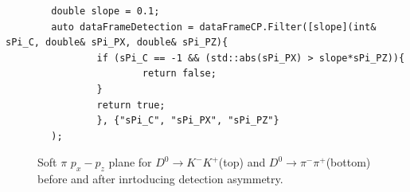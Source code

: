 \documentclass{article}
\begin{document}
    \begin{lstlisting}
        double slope = 0.1;
        auto dataFrameDetection = dataFrameCP.Filter([slope](int& sPi_C, double& sPi_PX, double& sPi_PZ){
                if (sPi_C == -1 && (std::abs(sPi_PX) > slope*sPi_PZ)){
                        return false;
                }
                return true;
                }, {"sPi_C", "sPi_PX", "sPi_PZ"}
        );
    \end{lstlisting}
    \begin{figure}[h!]
        \centering
        \hfill
        \caption{Soft $\pi$ $p_x - p_z$ plane for $D^{0}\to K^-K^+$(top) and $D^{0}\to \pi^-\pi^+$(bottom) before and after inrtoducing detection asymmetry.}
    \end{figure}
\end{document}
